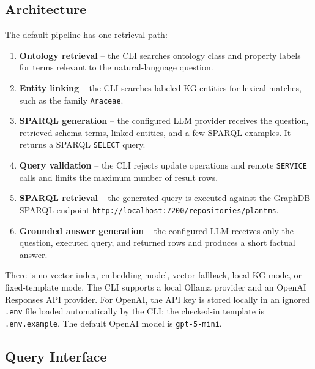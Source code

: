\documentclass[11pt,a4paper]{article}
\newcommand{\artifact}[1]{\texttt{#1}}
\begin{document}
\subsection{Architecture}

The default pipeline has one retrieval path:

\begin{enumerate}
  \item \textbf{Ontology retrieval} -- the CLI searches ontology class and
    property labels for terms relevant to the natural-language question.
  \item \textbf{Entity linking} -- the CLI searches labeled KG entities for
    lexical matches, such as the family \artifact{Araceae}.
  \item \textbf{SPARQL generation} -- the configured LLM provider receives the
    question, retrieved schema terms, linked entities, and a few SPARQL
    examples. It returns a SPARQL \artifact{SELECT} query.
  \item \textbf{Query validation} -- the CLI rejects update operations and remote
    \artifact{SERVICE} calls and limits the maximum number of result rows.
  \item \textbf{SPARQL retrieval} -- the generated query is executed against the
    GraphDB SPARQL endpoint \artifact{http://localhost:7200/repositories/plantms}.
  \item \textbf{Grounded answer generation} -- the configured LLM receives only
    the question, executed query, and returned rows and produces a short factual
    answer.
\end{enumerate}

There is no vector index, embedding model, vector fallback, local KG mode, or
fixed-template mode. The CLI supports a local Ollama provider and an OpenAI Responses API provider.
For OpenAI, the API key is stored locally in an ignored \artifact{.env} file
loaded automatically by the CLI; the checked-in template is
\artifact{.env.example}. The
default OpenAI model is \artifact{gpt-5-mini}.

\subsection{Query Interface}
\end{document}
